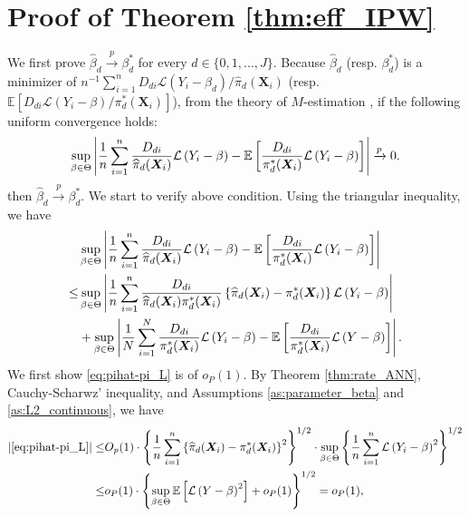 \documentclass[11pt]{article}
\numberwithin{equation}{section}
\begin{document}
\section{Proof of Theorem \ref{thm:eff_IPW}}\label{app:thm:eff_IPW}	
We first prove $\widehat{\beta}_d\xrightarrow{p}\beta_d^*$ for every $d\in\{0,1,...,J\}$. Because $\widehat{\beta}_d$  (resp. ${\beta}_d^*$) is a minimizer of $n^{-1}\sum_{i=1}^nD_{di}\mathcal{L}\left(Y_i-\beta_d\right)/\widehat{\pi}_d(\boldsymbol{X}_{i})$  (resp. $\mathbb{E}\left[D_{di}\mathcal{L}\left(Y_i-\beta\right)/\pi^*_d(\boldsymbol{X}_{i})\right]$), from the theory of $M$-estimation \cite[Theorem 5.7]{van1998asymptotic}, if the following uniform convergence holds:
\begin{align}
	\sup_{{\beta}\in\Theta}\left|\frac{1}{n}\sum_{i=1}^n\frac{D_{di}}{\widehat{\pi}_d(\boldsymbol{X}_{i})}\mathcal{L}\left(Y_i-\beta\right)-\mathbb{E}\left[\frac{D_{di}}{{\pi}^*_d(\boldsymbol{X}_{i})}\mathcal{L}\left(Y_i-\beta\right)\right] \right|\xrightarrow{p}0.\notag
\end{align}
then $\widehat{{\beta}}_d\xrightarrow{p}{\beta}^*_d$. We start to verify above condition. Using the triangular inequality, we have
\begin{align}
	&\sup_{{\beta}\in\Theta}\left|\frac{1}{n}\sum_{i=1}^n\frac{D_{di}}{\widehat{\pi}_d(\boldsymbol{X}_{i})}\mathcal{L}\left(Y_i-\beta\right)-\mathbb{E}\left[\frac{D_{di}}{{\pi}^*_d(\boldsymbol{X}_{i})}\mathcal{L}\left(Y_i-\beta\right)\right]  \right|\notag\\
	\leq &\sup_{{\beta}\in\Theta}\left|\frac{1}{n}\sum_{i=1}^n\frac{D_{di}}{\widehat{\pi}_d(\boldsymbol{X}_{i})\pi_d^*(\boldsymbol{X}_{i})}\left\{\widehat{\pi}_d(\boldsymbol{X}_{i})-\pi_d^*(\boldsymbol{X}_{i})\right\}\mathcal{L}\left(Y_i-\beta\right)\right| \label{eq:pihat-pi_L} \\
	&+\sup_{{\beta}\in\Theta}\left|\frac{1}{N}\sum_{i=1}^N\frac{D_{di}}{{\pi}^*_d(\boldsymbol{X}_{i})}\mathcal{L}\left(Y_i-\beta\right)-\mathbb{E}\left[\frac{D_{di}}{{\pi}^*_d(\boldsymbol{X}_{i})}\mathcal{L}\left(Y-\beta\right)\right] \right|.  \label{eq:pi0-Epi0_L}
\end{align}
We first show \eqref{eq:pihat-pi_L} is of $o_P(1)$. By Theorem \ref{thm:rate_ANN},  Cauchy-Scharwz' inequality, and  Assumptions \ref{as:parameter_beta} and \ref{as:L2_continuous}, we have
\begin{align*}
	|\eqref{eq:pihat-pi_L}|\leq&O_p(1)\cdot \left\{\frac{1}{n}\sum_{i=1}^n\left\{\widehat{\pi}_d(\boldsymbol{X}_{i})-\pi_d^*(\boldsymbol{X}_{i})\right\}^2\right\}^{1/2} \cdot \sup_{{\beta}\in\Theta} \left\{  \frac{1}{n}\sum_{i=1}^n\mathcal{L}\left(Y_i-\beta\right)^2\right\}^{1/2}\\
	\leq &o_P(1)\cdot \left\{\sup_{\beta\in\Theta} \mathbb{E}\left[\mathcal{L}\left(Y-\beta\right)^2\right] +o_P(1)\right\}^{1/2}=o_P(1),
\end{align*}
\end{document}
